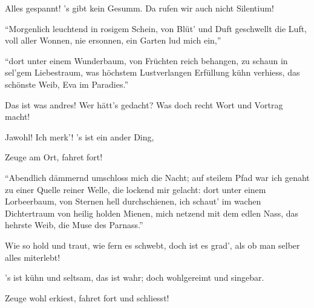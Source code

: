 \begin{drama}


Alles gespannt! 's gibt kein Gesumm.
Da rufen wir auch nicht Silentium!

\Waltherspeaks
{}

``Morgenlich leuchtend in rosigem Schein,
von Blüt' und Duft geschwellt die Luft,
voll aller Wonnen, nie ersonnen,
ein Garten lud mich ein,''





``dort unter einem Wunderbaum,
von Früchten reich behangen,
zu schaun in sel'gem Liebestraum,
was höchstem Lustverlangen
Erfüllung kühn verhiess,
das schönste Weib, Eva im Paradies.''



Das ist was andres! Wer hätt's gedacht?
Was doch recht Wort und Vortrag macht!



Jawohl! Ich merk'! 's ist ein ander Ding,

\Sachsspeaks
Zeuge am Ort, fahret fort!

\Waltherspeaks

``Abendlich dämmernd umschloss mich die Nacht;
auf steilem Pfad war ich genaht
zu einer Quelle reiner Welle,
die lockend mir gelacht:
dort unter einem Lorbeerbaum,
von Sternen hell durchschienen,
ich schaut' im wachen Dichtertraum
von heilig holden Mienen,
mich netzend mit dem edlen Nass,
das hehrste Weib,
die Muse des Parnass.''



Wie so hold und traut, wie fern es schwebt,
doch ist es grad', als ob man selber alles miterlebt!


's ist kühn und seltsam, das ist wahr;
doch wohlgereimt und singebar.

\Sachsspeaks
Zeuge wohl erkiest, fahret fort und schliesst!


\end{drama}
